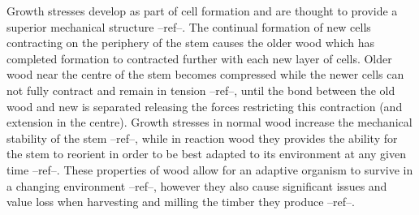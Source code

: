 Growth stresses develop as part of cell formation and are thought to provide a
superior mechanical structure --ref--. The continual formation of new cells contracting
on the periphery of the stem causes the older wood which has completed formation
to contracted further with each new layer of cells. Older wood near the centre
of the stem becomes compressed while the newer cells can not fully contract and
remain in tension --ref--, until the bond between the old wood and new is separated
releasing the forces restricting this contraction (and extension in the centre).
Growth stresses in normal wood increase the mechanical stability of the stem --ref--,
while in reaction wood they provides the ability for the stem to reorient in
order to be best adapted to its environment at any given time --ref--. These properties
of wood allow for an adaptive organism to survive in a changing environment --ref--,
however they also cause significant issues and value loss when harvesting and
milling the timber they produce --ref--.
